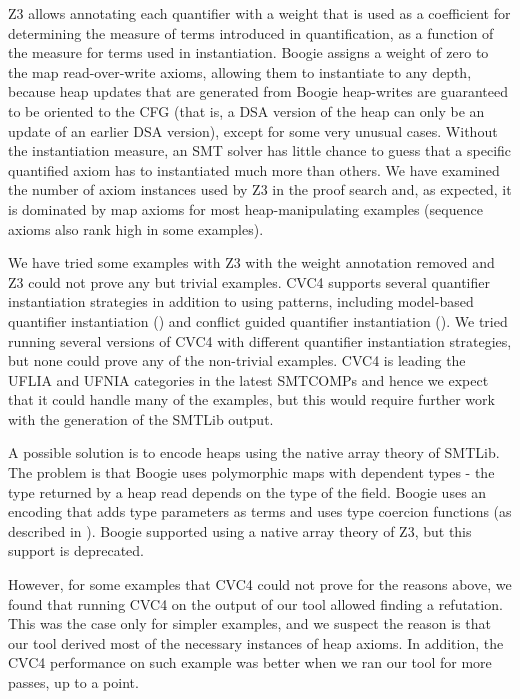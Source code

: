 Z3 allows annotating each quantifier with a weight that is used as a coefficient for determining the measure of terms introduced in quantification, as a function of the measure for terms used in instantiation. 
Boogie assigns a weight of zero to the map read-over-write axioms, allowing them to instantiate to any depth, because heap updates that are generated from Boogie heap-writes are guaranteed to be oriented to the CFG (that is, a DSA version of the heap can only be an update of an earlier DSA version), except for some very unusual cases. Without the instantiation measure, an SMT solver has little chance to guess that a specific quantified axiom has to instantiated much more than others. We have examined the number of axiom instances used by Z3 in the proof search and, as expected, it is dominated by map axioms for most heap-manipulating examples (sequence axioms also rank high in some examples).

We have tried some examples with Z3 with the weight annotation removed and Z3 could not prove any but trivial examples.
CVC4 supports several quantifier instantiation strategies in addition to using patterns, including model-based quantifier instantiation (\cite{DBLP:conf/cav/GeM09}) and conflict guided quantifier instantiation (\cite{DBLP:conf/fmcad/ReynoldsTM14}). We tried running several versions of CVC4 with different quantifier instantiation strategies, but none could prove any of the non-trivial examples. 
CVC4 is leading the UFLIA and UFNIA categories in the latest SMTCOMPs and hence we expect that it could handle many of the examples, but this would require further work with the generation of the SMTLib output. 

A possible solution is to encode heaps using the native array theory of SMTLib. The problem is that Boogie uses polymorphic maps with dependent types - the type returned by a heap read depends on the type of the field. 
Boogie uses an encoding that adds type parameters as terms and uses type coercion functions (as described in \cite{DBLP:conf/tacas/LeinoR10}). Boogie supported using a native array theory of Z3, but this support is deprecated. 

However, for some examples that CVC4 could not prove for the reasons above, we found that running CVC4 on the output of our tool allowed finding a refutation. This was the case only for simpler examples, and we suspect the reason is that our tool derived most of the necessary instances of heap axioms. In addition, the CVC4 performance on such example was better when we ran our tool for more passes, up to a point.

